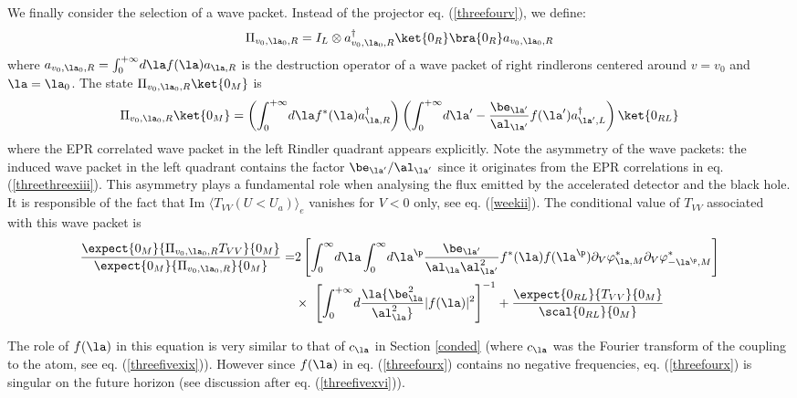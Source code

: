 \documentclass[12pt]{article}
\begin{document}
We finally consider the selection of a wave packet. Instead of the
projector eq. (\ref{threefourv}), we define:
\begin{equation} \Pi_{v_0,\la_0,R} = I_L \otimes a^\dagger_{v_0,\la_0,R}
\ket{0_R
} \bra{0_R} a_{v_0,\la_0,R} \end{equation} where
$a_{v_0,\la_0,R} = \int_0^{+\infty}\! d\la f(\la) a_{\la,R}$ is the
destruction operator of a wave packet of right rindlerons centered around
$v=v_0$ and $\la=\la_0$. The state $\Pi_{v_0,\la_0,R} \ket{0_M} $ is
 \begin{equation} \Pi_{v_0,\la_0,R} \ket{0_M}
= \left( \int_0^{+\infty}\! d\la f^*(\la) a^\dagger_{\la,R} \right)
\left( \int_0^{+\infty}\! d\la^\prime -
{\be_{\la^\prime} \over \al_{\la^\prime}}
f(\la^\prime) a^\dagger_{\la^\prime,L} \right)  \ket{0_{RL}}
\label{123}
\end{equation} where the EPR correlated wave packet in the left Rindler
quadrant appears explicitly.
Note the asymmetry of the wave packets: the
induced
wave packet
in the
left quadrant contains the factor $\be_{\la^\prime} / \al_{\la^\prime}$
since it originates
from
 the EPR correlations in eq. (\ref{threethreexiii}). This asymmetry plays
a fundamental role when analysing the flux emitted by the accelerated
detector and the black hole. It is responsible of the fact that
Im $ \langle T_{VV}(U<U_a) \rangle _e$ vanishes for $V<0$ only, see  eq.
(\ref{weekii}). The conditional value of $T_{VV}$ associated with this wave
packet is
\begin{eqnarray} {
\expect{0_M}{ \Pi_{v_0,\la_0,R} T_{VV} }{0_M}
\over
\expect{0_M} { \Pi_{v_0,\la_0,R} } {0_M}
}  = &
2 \left[
 \int_0^{\infty}\! d\la \int_0^{\infty}\! d\la^{\p}
{\be_{\la^\prime} \over \al_\la \al_{\la^{\prime}}^2 }
f^*(\la) f(\la^{\p}) \partial_V
\varphi_{\la,M}^* \partial_V \varphi_{-\la^{\p},M}^* \right]
 \nonumber\\ &
\times\ \left[  \int_0^{+\infty}\! d\la
{ \be_\la^2  \over \al_\la^2} \vert f(\la) \vert^2
 \right] ^{-1}
+ {
\expect{0_{RL}} {  T_{VV} }{0_M} \over \scal{0_{RL}}{0_M} }
\label{threefourx}
\end{eqnarray}

The role of $f(\la)$
in this equation is very similar to that of $c_\la$ in
Section \ref{conded} (where
$c_\la$ was the Fourier transform of the coupling to the atom, see eq.
(\ref{threefivexix})). However since $f(\la)$ in eq. (\ref{threefourx})
contains no negative frequencies, eq. (\ref{threefourx}) is singular on the
future horizon (see discussion after eq. (\ref{threefivexvi})).
\end{document}
